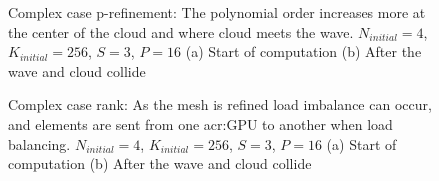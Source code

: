 \begin{figure}[H]
	\centering
	\hfill
	\caption{Complex case p-refinement: The polynomial order increases more at the center of the cloud and where cloud meets the wave. \(N_{initial} = 4\), \(K_{initial} = 256\), \(S = 3\), \(P = 16\) (a) Start of computation (b) After the wave and cloud collide}\label{fig:cloud_N}
\end{figure}

\begin{figure}[H]
	\centering
	\hfill
	\caption{Complex case rank: As the mesh is refined load imbalance can occur, and elements are sent from one \acrshort{acr:GPU} to another when load balancing. \(N_{initial} = 4\), \(K_{initial} = 256\), \(S = 3\), \(P = 16\) (a) Start of computation (b) After the wave and cloud collide}\label{fig:cloud_rank}
\end{figure}

